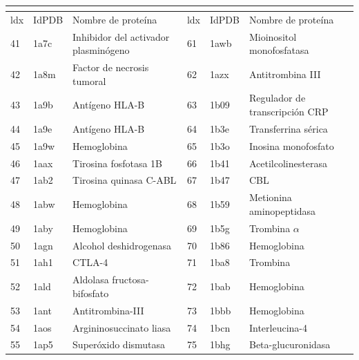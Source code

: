  	\begin{table}[H]
 		\centering
 		\begin{footnotesize}
 			\begin{tabular}{||l|ll||l|ll||}
 				\multicolumn{6}{c}{}                                         \\
 				\hline
 				ldx & IdPDB & Nombre de prote\'{i}na               & ldx & IdPDB & Nombre de prote\'{i}na           \\ 
 				\hline
 				41  & 1a7c  & Inhibidor del activador plasmin\'{o}geno & 61 & 1awb  & Mioinositol monofosfatasa        \\
 				42  & 1a8m  & Factor de necrosis tumoral           & 62 & 1azx  & Antitrombina III                 \\
 				43  & 1a9b  & Ant\'{i}geno HLA-B                       & 63 & 1b09  & Regulador de transcripci\'{o}n CRP   \\
 				44  & 1a9e  & Ant\'{i}geno HLA-B                       & 64 & 1b3e  & Transferrina s\'{e}rica              \\
 				45  & 1a9w  & Hemoglobina                          & 65 & 1b3o  & Inosina monofosfato              \\
 				46  & 1aax  & Tirosina fosfotasa 1B                & 66 & 1b41  & Acetilcolinesterasa              \\
 				47  & 1ab2  & Tirosina quinasa C-ABL               & 67 & 1b47  & CBL                              \\
 				48  & 1abw  & Hemoglobina                          & 68 & 1b59  & Metionina aminopeptidasa         \\
 				49  & 1aby  & Hemoglobina                          & 69 & 1b5g  & Trombina $\alpha$                \\
 				50  & 1agn  & Alcohol deshidrogenasa               & 70 & 1b86  & Hemoglobina                      \\
 				51  & 1ah1  & CTLA-4                               & 71 & 1ba8  & Trombina                         \\
 				52  & 1ald  & Aldolasa fructosa-bifosfato          & 72 & 1bab  & Hemoglobina                      \\
 				53  & 1ant  & Antitrombina-III                     & 73 & 1bbb  & Hemoglobina                      \\
 				54  & 1aos  & Argininosuccinato liasa              & 74 & 1bcn  & Interleucina-4                   \\
 				55  & 1ap5  & Super\'{o}xido dismutasa                 & 75 & 1bhg  & Beta-glucuronidasa               \\

\end{tabular}
\end{footnotesize}
\end{table}
